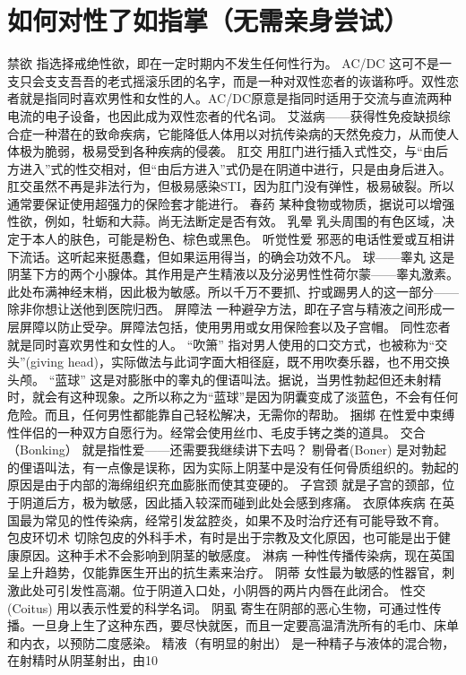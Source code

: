 \documentclass[12pt,UTF8,openany]{ctexbook}
\begin{document}
\chapter{如何对性了如指掌（无需亲身尝试）}
禁欲
指选择戒绝性欲，即在一定时期内不发生任何性行为。
AC/DC
这可不是一支只会支支吾吾的老式摇滚乐团的名字，而是一种对双性恋者的诙谐称呼。双性恋者就是指同时喜欢男性和女性的人。AC/DC原意是指同时适用于交流与直流两种电流的电子设备，也因此成为双性恋者的代名词。
艾滋病——获得性免疫缺损综合症一种潜在的致命疾病，它能降低人体用以对抗传染病的天然免疫力，从而使人体极为脆弱，极易受到各种疾病的侵袭。
肛交
用肛门进行插入式性交，与“由后方进入”式的性交相对，但“由后方进入”式仍是在阴道中进行，只是由身后进入。肛交虽然不再是非法行为，但极易感染STI，因为肛门没有弹性，极易破裂。所以通常要保证使用超强力的保险套才能进行。
春药
某种食物或物质，据说可以增强性欲，例如，牡蛎和大蒜。尚无法断定是否有效。
乳晕
乳头周围的有色区域，决定于本人的肤色，可能是粉色、棕色或黑色。
听觉性爱
邪恶的电话性爱或互相讲下流话。这听起来挺愚蠢，但如果运用得当，的确会功效不凡。
球——睾丸
这是阴茎下方的两个小腺体。其作用是产生精液以及分泌男性性荷尔蒙——睾丸激素。此处布满神经末梢，因此极为敏感。所以千万不要抓、拧或踢男人的这一部分——除非你想让送他到医院归西。
屏障法
一种避孕方法，即在子宫与精液之间形成一层屏障以防止受孕。屏障法包括，使用男用或女用保险套以及子宫帽。
同性恋者
就是同时喜欢男性和女性的人。
“吹箫”
指对男人使用的口交方式，也被称为“交头”(giving head)，实际做法与此词字面大相径庭，既不用吹奏乐器，也不用交换头颅。
“蓝球”
这是对膨胀中的睾丸的俚语叫法。据说，当男性勃起但还未射精时，就会有这种现象。之所以称之为“蓝球”是因为阴囊变成了淡蓝色，不会有任何危险。而且，任何男性都能靠自己轻松解决，无需你的帮助。
捆绑
在性爱中束缚性伴侣的一种双方自愿行为。经常会使用丝巾、毛皮手铐之类的道具。
交合（Bonking）
就是指性爱——还需要我继续讲下去吗？
剔骨者(Boner)
是对勃起的俚语叫法，有一点像是误称，因为实际上阴茎中是没有任何骨质组织的。勃起的原因是由于内部的海绵组织充血膨胀而使其变硬的。
子宫颈
就是子宫的颈部，位于阴道后方，极为敏感，因此插入较深而碰到此处会感到疼痛。
衣原体疾病
在英国最为常见的性传染病，经常引发盆腔炎，如果不及时治疗还有可能导致不育。
包皮环切术
切除包皮的外科手术，有时是出于宗教及文化原因，也可能是出于健康原因。这种手术不会影响到阴茎的敏感度。
淋病
一种性传播传染病，现在英国呈上升趋势，仅能靠医生开出的抗生素来治疗。
阴蒂
女性最为敏感的性器官，刺激此处可引发性高潮。位于阴道入口处，小阴唇的两片内唇在此闭合。
性交(Coitus)
用以表示性爱的科学名词。
阴虱
寄生在阴部的恶心生物，可通过性传播。一旦身上生了这种东西，要尽快就医，而且一定要高温清洗所有的毛巾、床单和内衣，以预防二度感染。
精液（有明显的射出）
是一种精子与液体的混合物，在射精时从阴茎射出，由10%
\end{document}
